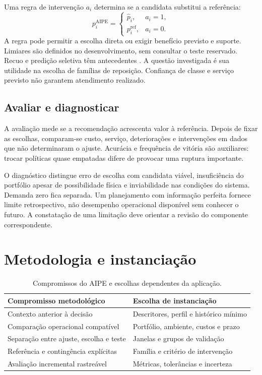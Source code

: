 Uma regra de intervenção $a_i$ determina se a candidata substitui a referência:
\[
 p_i^{\mathrm{AIPE}}=
 \begin{cases}\widehat p_i,&a_i=1,\\p_i^{\mathrm{ref}},&a_i=0.\end{cases}
\]
A regra pode permitir a escolha direta ou exigir benefício previsto e suporte. Limiares são definidos no desenvolvimento, sem consultar o teste reservado. Recuo e predição seletiva têm antecedentes \citep{GeifmanElYaniv2019SelectiveNet,Laroche2019SPIBB}. A questão investigada é sua utilidade na escolha de famílias de reposição. Confiança de classe e serviço previsto não garantem atendimento realizado.

\subsection{Avaliar e diagnosticar}
A avaliação mede se a recomendação acrescenta valor à referência. Depois de fixar as escolhas, comparam-se custo, serviço, deteriorações e intervenções em dados que não determinaram o ajuste. Acurácia e frequência de vitória são auxiliares: trocar políticas quase empatadas difere de provocar uma ruptura importante.

O diagnóstico distingue erro de escolha com candidata viável, insuficiência do portfólio apesar de possibilidade física e inviabilidade nas condições do sistema. Demanda zero fica separada. Um planejamento com informação perfeita fornece limite retrospectivo, não desempenho operacional disponível sem conhecer o futuro. A constatação de uma limitação deve orientar a revisão do componente correspondente.

\section{Metodologia e instanciação}
\begin{table}[htbp]\centering\small
\caption{Compromissos do AIPE e escolhas dependentes da aplicação.}\label{tab:metodo_instancia}
\begin{tabular}{@{}p{5.6cm}p{7cm}@{}}\toprule
Compromisso metodológico & Escolha de instanciação\\\midrule
Contexto anterior à decisão & Descritores, perfil e histórico mínimo\\
Comparação operacional compatível & Portfólio, ambiente, custos e prazo\\
Separação entre ajuste, escolha e teste & Janelas e grupos de validação\\
Referência e contingência explícitas & Família e critério de intervenção\\
Avaliação incremental rastreável & Métricas, tolerâncias e incerteza\\\bottomrule
\end{tabular}\end{table}

